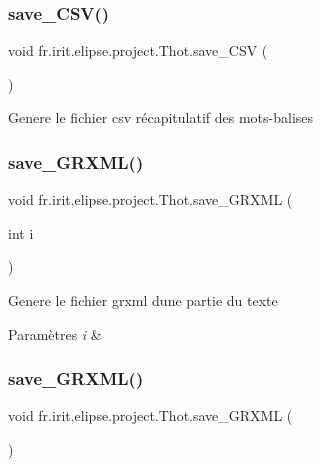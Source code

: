 \subsubsection{\texorpdfstring{save\_CSV()}{save\_CSV()}}
{\footnotesize\ttfamily void fr.\+irit.\+elipse.\+project.\+Thot.\+save\+\_\+\+C\+SV (\begin{DoxyParamCaption}{ }\end{DoxyParamCaption})}

Genere le fichier csv récapitulatif des mots-\/balises\mbox{\label{classfr_1_1irit_1_1elipse_1_1project_1_1_thot_a0434fbedf5ed08fba68adb12bb8bb72e}} 
\subsubsection{\texorpdfstring{save\_GRXML()}{save\_GRXML()}\hspace{0.1cm}{\footnotesize\ttfamily [1/2]}}
{\footnotesize\ttfamily void fr.\+irit.\+elipse.\+project.\+Thot.\+save\+\_\+\+G\+R\+X\+ML (\begin{DoxyParamCaption}\item[{int}]{i }\end{DoxyParamCaption})}

Genere le fichier grxml d\textquotesingle{}une partie du texte 
\begin{DoxyParams}{Paramètres}
{\em i} & \\
\hline
\end{DoxyParams}
\mbox{\label{classfr_1_1irit_1_1elipse_1_1project_1_1_thot_a40e71ed10b6e96a8ef9c4ad3b1b40efa}} 
\subsubsection{\texorpdfstring{save\_GRXML()}{save\_GRXML()}\hspace{0.1cm}{\footnotesize\ttfamily [2/2]}}
{\footnotesize\ttfamily void fr.\+irit.\+elipse.\+project.\+Thot.\+save\+\_\+\+G\+R\+X\+ML (\begin{DoxyParamCaption}{ }\end{DoxyParamCaption})}

